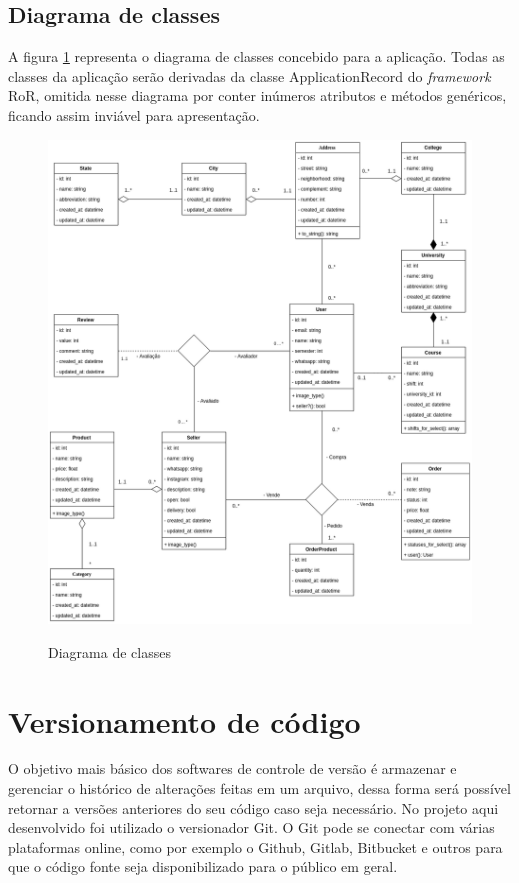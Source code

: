 \subsection{Diagrama de classes}
A figura \ref{fig:class} representa o diagrama de classes concebido para a aplicação. Todas as classes da aplicação serão derivadas da classe ApplicationRecord do \textit{framework} RoR, omitida nesse diagrama por conter inúmeros atributos e métodos genéricos, ficando assim inviável para apresentação.
\begin{figure}[htbp!]
  \centering
  \caption{Diagrama de classes}
  \includegraphics[width=1\textwidth]{figs/class.png}
    \label{fig:class}
\end{figure}

\section{Versionamento de código}
O objetivo mais básico dos softwares de controle de versão é armazenar e gerenciar o histórico de alterações feitas em um arquivo, dessa forma será possível retornar a versões anteriores do seu código caso seja necessário. No projeto aqui desenvolvido foi utilizado o versionador Git. O Git pode se conectar com várias plataformas online, como por exemplo o Github, Gitlab, Bitbucket e outros para que o código fonte seja disponibilizado para o público em geral.
